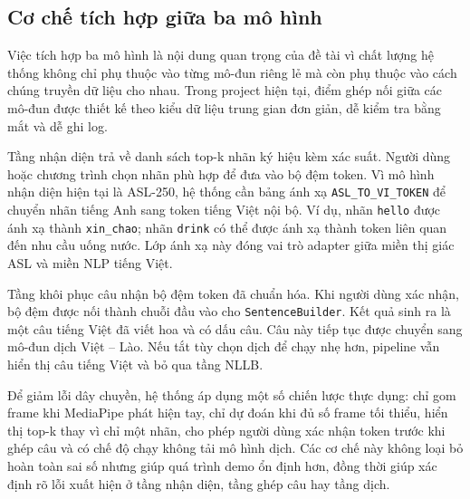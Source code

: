 ﻿\subsection{Cơ chế tích hợp giữa ba mô hình}

Việc tích hợp ba mô hình là nội dung quan trọng của đề tài vì chất lượng hệ thống không chỉ phụ thuộc vào từng mô-đun riêng lẻ mà còn phụ thuộc vào cách chúng truyền dữ liệu cho nhau. Trong project hiện tại, điểm ghép nối giữa các mô-đun được thiết kế theo kiểu dữ liệu trung gian đơn giản, dễ kiểm tra bằng mắt và dễ ghi log.

Tầng nhận diện trả về danh sách top-k nhãn ký hiệu kèm xác suất. Người dùng hoặc chương trình chọn nhãn phù hợp để đưa vào bộ đệm token. Vì mô hình nhận diện hiện tại là ASL-250, hệ thống cần bảng ánh xạ \texttt{ASL\_TO\_VI\_TOKEN} để chuyển nhãn tiếng Anh sang token tiếng Việt nội bộ. Ví dụ, nhãn \texttt{hello} được ánh xạ thành \texttt{xin\_chao}; nhãn \texttt{drink} có thể được ánh xạ thành token liên quan đến nhu cầu uống nước. Lớp ánh xạ này đóng vai trò adapter giữa miền thị giác ASL và miền NLP tiếng Việt.

Tầng khôi phục câu nhận bộ đệm token đã chuẩn hóa. Khi người dùng xác nhận, bộ đệm được nối thành chuỗi đầu vào cho \texttt{SentenceBuilder}. Kết quả sinh ra là một câu tiếng Việt đã viết hoa và có dấu câu. Câu này tiếp tục được chuyển sang mô-đun dịch Việt -- Lào. Nếu tắt tùy chọn dịch để chạy nhẹ hơn, pipeline vẫn hiển thị câu tiếng Việt và bỏ qua tầng NLLB.

Để giảm lỗi dây chuyền, hệ thống áp dụng một số chiến lược thực dụng: chỉ gom frame khi MediaPipe phát hiện tay, chỉ dự đoán khi đủ số frame tối thiểu, hiển thị top-k thay vì chỉ một nhãn, cho phép người dùng xác nhận token trước khi ghép câu và có chế độ chạy không tải mô hình dịch. Các cơ chế này không loại bỏ hoàn toàn sai số nhưng giúp quá trình demo ổn định hơn, đồng thời giúp xác định rõ lỗi xuất hiện ở tầng nhận diện, tầng ghép câu hay tầng dịch.


